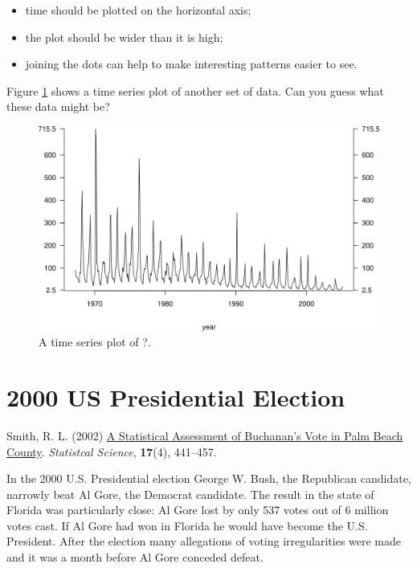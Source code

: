 \documentclass[
  british,
]{book}
\providecommand{\tightlist}{%
  \setlength{\itemsep}{0pt}\setlength{\parskip}{0pt}}
\begin{document}
\begin{itemize}
\tightlist
\item
  time should be plotted on the horizontal axis;
\item
  the plot should be wider than it is high;
\item
  joining the dots can help to make interesting patterns easier to see.
\end{itemize}

Figure \ref{fig:fluts} shows a time series plot of another set of data. Can you guess what these data might be?

\begin{figure}

{\centering \includegraphics[width=0.8\linewidth]{images/flu_tufte_no_label} 

}

\caption{A time series plot of ?.}\label{fig:fluts}
\end{figure}
\FloatBarrier

\hypertarget{election}{%
\section{2000 US Presidential Election}\label{election}}

Smith, R. L. (2002) \href{https://doi.org/10.1214/ss/1049993203}{A Statistical Assessment of Buchanan's Vote in Palm Beach County}. \emph{Statistcal Science}, \textbf{17}(4), 441--457.

In the 2000 U.S. Presidential election George W. Bush, the Republican candidate, narrowly beat Al Gore, the Democrat candidate. The result in the state of Florida was particularly close: Al Gore lost by only 537 votes out of 6 million votes cast. If Al Gore had won in Florida he would have become the U.S. President. After the election many allegations of voting irregularities were made and it was a month before Al Gore conceded defeat.
\end{document}
